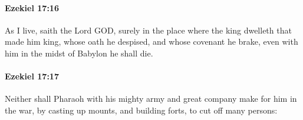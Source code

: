 		\paragraph{Ezekiel 17:16} %
			\label{EZEKIEL-17-16}

			As I live, saith the Lord GOD, surely in the place where the king dwelleth that made him king, whose oath he despised, and whose covenant he brake, even with him in the midst of Babylon he shall die.


		\paragraph{Ezekiel 17:17} %
			\label{EZEKIEL-17-17}

			Neither shall Pharaoh with his mighty army and great company make for him in the war, by casting up mounts, and building forts, to cut off many persons:


